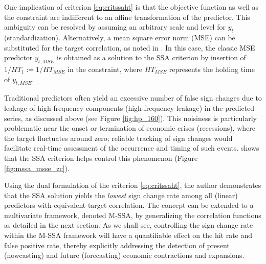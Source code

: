 \documentclass[11pt,a4paper]{article}
\begin{document}
One implication of criterion \eqref{eq:critssaht} is that the objective function as well as the constraint are indifferent to an affine transformation of the predictor. This ambiguity can be resolved by assuming an arbitrary scale and level for $y_t$ (standardization). Alternatively, a mean square error norm (MSE) can be substituted for the target correlation, as noted in \cite{Wildi2025}. In this case, the classic MSE predictor $y_{t,MSE}$ is obtained as a solution to the SSA criterion by insertion of $1/HT_1:=1/HT_{MSE}$ in the constraint, where $HT_{MSE}$ represents the holding time of $y_{t,MSE}$. 

Traditional predictors often yield an excessive number of false sign changes due to leakage of high-frequency components (high-frequency leakage) in the predicted series, as discussed above (see Figure \ref{fig:hp_160}). This noisiness is particularly problematic near the onset or termination of economic crises (recessions), where the target fluctuates around zero; reliable tracking of sign changes would facilitate real-time assessment of the occurrence and timing of such events. \cite{Wildi2025} shows that the SSA criterion helps control this phenomenon (Figure \ref{fig:mssa_msse_zc}).
 
Using the dual formulation of the criterion \eqref{eq:critssaht}, the author demonstrates that the SSA solution yields the \emph{lowest} sign change rate among all (linear) predictors with equivalent target correlation. 
The concept can be extended to a multivariate framework, denoted M-SSA, by generalizing the correlation functions as detailed in the next section. As we shall see, controlling the sign change rate within the M-SSA framework will have a quantifiable effect on the hit rate and false positive rate, thereby explicitly addressing the detection of present (nowcasting) and future (forecasting) economic contractions and expansions.
\end{document}
